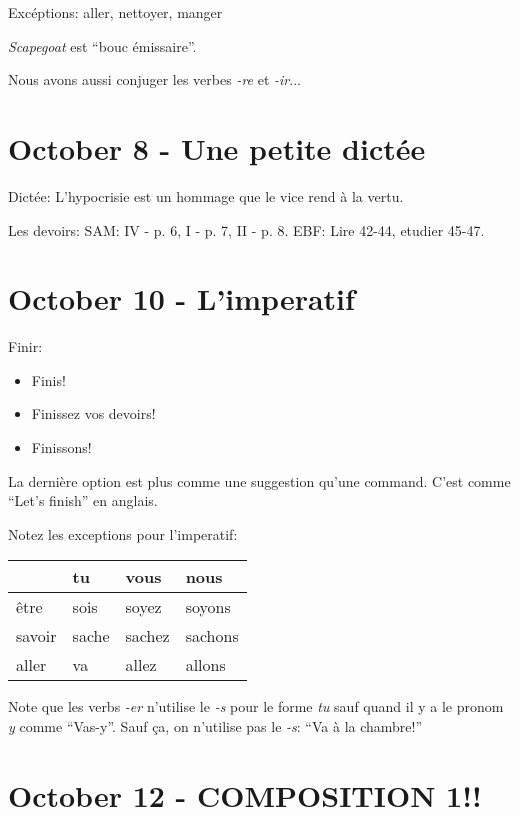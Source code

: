 \documentclass{report}
\begin{document}
Exc\'eptions: aller, nettoyer, manger

\emph{Scapegoat} est "`bouc \'emissaire"'.

Nous avons aussi conjuger les verbes \emph{-re} et \emph{-ir}...

\section{October 8 - Une petite dict\'ee}

Dict\'ee: L'hypocrisie est un hommage que le vice rend \`a la vertu. 

Les devoirs: SAM: IV - p. 6, I - p. 7, II - p. 8.
EBF: Lire 42-44, etudier 45-47.

\section{October 10 - L'imperatif}

Finir: \begin{itemize} \item Finis!
\item Finissez vos devoirs!
\item Finissons!
\end{itemize}

La derni\`ere option est plus comme une suggestion qu'une command. C'est comme "`Let's finish"' en anglais.

Notez les exceptions pour l'imperatif:

\begin{center}
\begin{tabular}{|l || l | l | l|}
\hline
&tu&vous&nous\\
\hline
\^etre & sois&soyez&soyons\\
\hline
savoir&sache&sachez&sachons\\
\hline
aller& va & allez & allons\\
\hline
\end{tabular}
\end{center}

Note que les verbs \emph{-er} n'utilise le \emph{-s} pour le forme \emph{tu} sauf quand il y a le pronom \emph{y} comme "`Vas-y"'. Sauf \c{c}a, on n'utilise pas le \emph{-s}: "`Va \`a la chambre!"'

\section{October 12 - COMPOSITION 1!!}
\end{document}
